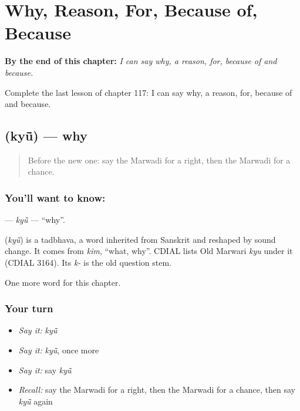 
\chapter{Why, Reason, For, Because of, Because}
\label{ch:mw-why-reason-for-because-of-because}

\begin{chapteropening}
\textbf{By the end of this chapter:} \emph{I can say why, a reason, for, because of and because.}

Complete the last lesson of chapter 117: I can say why, a reason, for, because of and because.
\end{chapteropening}

\section[\texorpdfstring{\mw{क्यूं} (kyū̃)}{क्यूं (kyū̃)}]{ (kyū̃) — why}

\label{lesson:MW-C117-kyu}



\begin{quote}
Before the new one: say the Marwadi for a right, then the Marwadi for a chance.
\end{quote}

\subsection*{You'll want to know: }
\textbf{} — \emph{kyū̃} — \textquotedblleft{}why\textquotedblright{}.

\begin{cousinweb}
\textbf{} (\emph{kyū̃}) is a tadbhava, a word inherited from Sanskrit and reshaped by sound change. It comes from \emph{kim}, \textquotedblleft{}what, why\textquotedblright{}. CDIAL lists Old Marwari \emph{kyu} under it (CDIAL 3164). Its \emph{k-} is the old question stem.
\end{cousinweb}

\begin{grammarlens}[title={What you've built}]
One more word for this chapter.
\end{grammarlens}

\subsection*{Your turn}
\begin{itemize}
\raggedright
  \item \emph{Say it:} \emph{kyū̃}
  \item \emph{Say it:} \emph{kyū̃}, once more
  \item \emph{Say it:} say \emph{kyū̃}
  \item \emph{Recall:} say the Marwadi for a right, then the Marwadi for a chance, then say \emph{kyū̃} again
\end{itemize}

